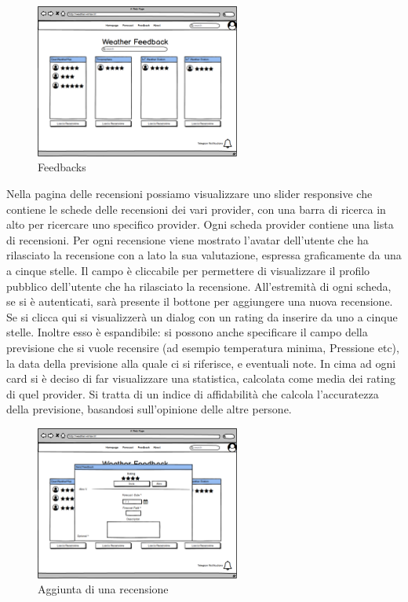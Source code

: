\begin{figure}[H]
    \caption{Feedbacks}
    \label{fig:Home}
    \centering
    \includegraphics[width=0.6\textwidth]{MockUps/feedback.png}
\end{figure}
Nella pagina delle recensioni possiamo visualizzare uno slider responsive che contiene le schede delle recensioni dei vari provider, con una barra di ricerca in alto per ricercare uno specifico provider.
Ogni scheda provider contiene una lista di recensioni. Per ogni recensione viene mostrato l'avatar dell'utente che ha rilasciato la recensione con a lato la sua valutazione, espressa graficamente da una a cinque stelle. Il campo è cliccabile per permettere di visualizzare il profilo pubblico dell'utente che ha rilasciato la recensione. All'estremità di ogni scheda, se si è autenticati, sarà presente il bottone per aggiungere una nuova recensione. Se si clicca qui si visualizzerà un dialog con un rating da inserire da uno a cinque stelle. Inoltre esso è espandibile: si possono anche specificare il campo della previsione che si vuole recensire (ad esempio temperatura minima, Pressione etc), la data della previsione alla quale ci si riferisce, e eventuali note.
In cima ad ogni card si è deciso di far visualizzare una statistica, calcolata come media dei rating di quel provider. Si tratta di un indice di affidabilità che calcola l'accuratezza della previsione, basandosi sull'opinione delle altre persone.\\



\begin{figure}[H]
    \caption{Aggiunta di una recensione}
    \label{fig:Home}
    \centering
    \includegraphics[width=0.6\textwidth]{MockUps/sendFeedback.png}
\end{figure}

